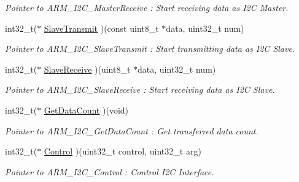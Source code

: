 \begin{DoxyCompactItemize}
\begin{DoxyCompactList}\small\item\em Pointer to A\+R\+M\+\_\+\+I2\+C\+\_\+\+Master\+Receive \+: Start receiving data as I2C Master. \end{DoxyCompactList}\item 
\mbox{\label{struct___a_r_m___d_r_i_v_e_r___i2_c_a03dc2b086d1ac1ff21f8adeab0082adb}} 
int32\+\_\+t($\ast$ \mbox{\hyperlink{struct___a_r_m___d_r_i_v_e_r___i2_c_a03dc2b086d1ac1ff21f8adeab0082adb}{Slave\+Transmit}} )(const uint8\+\_\+t $\ast$data, uint32\+\_\+t num)
\begin{DoxyCompactList}\small\item\em Pointer to A\+R\+M\+\_\+\+I2\+C\+\_\+\+Slave\+Transmit \+: Start transmitting data as I2C Slave. \end{DoxyCompactList}\item 
\mbox{\label{struct___a_r_m___d_r_i_v_e_r___i2_c_a2d0031c687d4b806cef765b8f1196b55}} 
int32\+\_\+t($\ast$ \mbox{\hyperlink{struct___a_r_m___d_r_i_v_e_r___i2_c_a2d0031c687d4b806cef765b8f1196b55}{Slave\+Receive}} )(uint8\+\_\+t $\ast$data, uint32\+\_\+t num)
\begin{DoxyCompactList}\small\item\em Pointer to A\+R\+M\+\_\+\+I2\+C\+\_\+\+Slave\+Receive \+: Start receiving data as I2C Slave. \end{DoxyCompactList}\item 
\mbox{\label{struct___a_r_m___d_r_i_v_e_r___i2_c_a1851018b9ab080689af2d208558f9cea}} 
int32\+\_\+t($\ast$ \mbox{\hyperlink{struct___a_r_m___d_r_i_v_e_r___i2_c_a1851018b9ab080689af2d208558f9cea}{Get\+Data\+Count}} )(void)
\begin{DoxyCompactList}\small\item\em Pointer to A\+R\+M\+\_\+\+I2\+C\+\_\+\+Get\+Data\+Count \+: Get transferred data count. \end{DoxyCompactList}\item 
\mbox{\label{struct___a_r_m___d_r_i_v_e_r___i2_c_a5e96d73d3a3c366aba50bf5304edb029}} 
int32\+\_\+t($\ast$ \mbox{\hyperlink{struct___a_r_m___d_r_i_v_e_r___i2_c_a5e96d73d3a3c366aba50bf5304edb029}{Control}} )(uint32\+\_\+t control, uint32\+\_\+t arg)
\begin{DoxyCompactList}\small\item\em Pointer to A\+R\+M\+\_\+\+I2\+C\+\_\+\+Control \+: Control I2C Interface. \end{DoxyCompactList}\item 

\end{DoxyCompactItemize}
